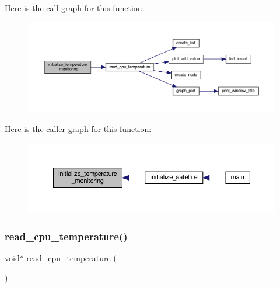 Here is the call graph for this function\+:
\nopagebreak
\begin{figure}[H]
\begin{center}
\leavevmode
\includegraphics[width=350pt]{temperature-monitoring_8c_a1d2bab81a3e6aa84eb0c2e0172594299_cgraph}
\end{center}
\end{figure}
Here is the caller graph for this function\+:
\nopagebreak
\begin{figure}[H]
\begin{center}
\leavevmode
\includegraphics[width=350pt]{temperature-monitoring_8c_a1d2bab81a3e6aa84eb0c2e0172594299_icgraph}
\end{center}
\end{figure}
\mbox{\label{temperature-monitoring_8c_a6a33eb327dd6b9aac62b32cf7220cca0}} 
\subsubsection{\texorpdfstring{read\+\_\+cpu\+\_\+temperature()}{read\_cpu\_temperature()}}
{\footnotesize\ttfamily void$\ast$ read\+\_\+cpu\+\_\+temperature (\begin{DoxyParamCaption}{ }\end{DoxyParamCaption})}

